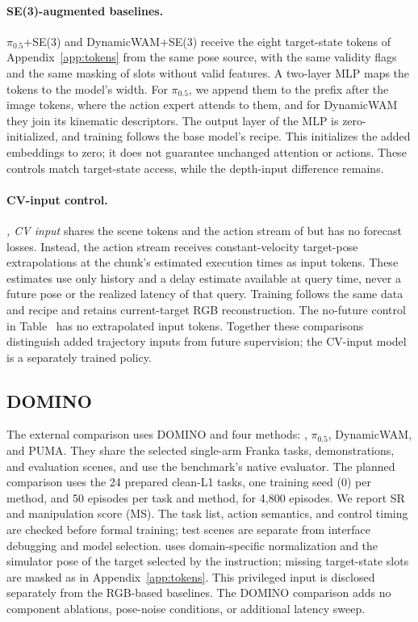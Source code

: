 \paragraph{SE(3)-augmented baselines.} $\pi_{0.5}$+SE(3) and DynamicWAM+SE(3)
receive the eight target-state tokens of Appendix~\ref{app:tokens} from the same
pose source, with the same validity flags and the same masking of slots without valid
features. A two-layer
MLP maps the tokens to the model's width. For $\pi_{0.5}$, we append them to the
prefix after the image tokens, where the action expert attends to them, and for
DynamicWAM they join its kinematic descriptors. The output layer of the MLP is
zero-initialized, and training follows the base model's recipe. This initializes
the added embeddings to zero; it does not guarantee unchanged attention or actions.
These controls match target-state access, while the depth-input difference remains.

\paragraph{CV-input control.} \emph{\ours, CV input} shares the scene tokens and
the action stream of \ours but has no forecast losses. Instead, the action stream
receives constant-velocity target-pose extrapolations at the chunk's estimated
execution times as input tokens. These estimates use only history and a delay
estimate available at query time, never a future pose or the realized latency of
that query. Training follows the same data and recipe and retains current-target
RGB reconstruction. The no-future control in Table~ has no
extrapolated input tokens. Together these comparisons distinguish added trajectory
inputs from future supervision; the CV-input model is a separately trained policy.



\subsection{DOMINO}
\label{app:external}
The external comparison uses DOMINO \cite{domino} and four methods:
\ours, $\pi_{0.5}$, DynamicWAM, and PUMA. They share the selected single-arm
Franka tasks, demonstrations, and evaluation scenes, and use the benchmark's
native evaluator. The planned comparison uses the 24 prepared clean-L1 tasks,
one training seed (0) per method, and 50 episodes per task and method,
for 4{,}800 episodes. We report SR and manipulation score (MS).
The task list, action semantics, and control timing are checked before formal
training; test scenes are separate from interface debugging and model selection.
\ours uses domain-specific normalization and the simulator pose of the target
selected by the instruction; missing target-state slots are masked as in
Appendix~\ref{app:tokens}. This privileged input is disclosed separately from the
RGB-based baselines. The DOMINO comparison adds no component ablations,
pose-noise conditions, or additional latency sweep.

